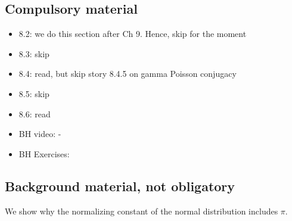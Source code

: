 \documentclass[a4paper,11pt]{article}
\begin{document}
\subsection{Compulsory material}
\label{sec:compulsory-material}


\begin{itemize}
\item 8.2: we do this section after Ch 9. Hence, skip for the moment
\item 8.3: skip
\item 8.4: read, but skip story 8.4.5 on gamma Poisson conjugacy
\item 8.5: skip
\item 8.6: read
\item BH video: -
\item BH Exercises:
\end{itemize}

\subsection{Background material, not obligatory}
\label{sec:backgr-mater-not-1}



We show why the normalizing constant of the normal distribution includes $\pi$.
\end{document}
